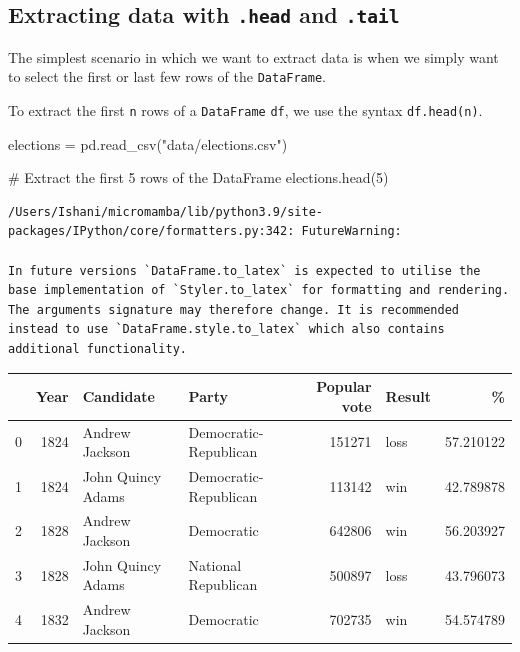 \documentclass[
  letterpaper,
  DIV=11,
  numbers=noendperiod]{scrreprt}
\newenvironment{Shaded}{\begin{snugshade}}{\end{snugshade}}
\newcommand{\CommentTok}[1]{\textcolor[rgb]{0.37,0.37,0.37}{#1}}
\newcommand{\DecValTok}[1]{\textcolor[rgb]{0.68,0.00,0.00}{#1}}
\newcommand{\NormalTok}[1]{\textcolor[rgb]{0.00,0.23,0.31}{#1}}
\newcommand{\OperatorTok}[1]{\textcolor[rgb]{0.37,0.37,0.37}{#1}}
\newcommand{\StringTok}[1]{\textcolor[rgb]{0.13,0.47,0.30}{#1}}
\begin{document}
\hypertarget{extracting-data-with-.head-and-.tail}{%
\subsection{\texorpdfstring{Extracting data with \texttt{.head} and
\texttt{.tail}}{Extracting data with .head and .tail}}\label{extracting-data-with-.head-and-.tail}}

The simplest scenario in which we want to extract data is when we simply
want to select the first or last few rows of the \texttt{DataFrame}.

To extract the first \texttt{n} rows of a \texttt{DataFrame}
\texttt{df}, we use the syntax \texttt{df.head(n)}.

\begin{Shaded}
\begin{Highlighting}[]
\NormalTok{elections }\OperatorTok{=}\NormalTok{ pd.read\_csv(}\StringTok{"data/elections.csv"}\NormalTok{)}
\end{Highlighting}
\end{Shaded}

\begin{Shaded}
\begin{Highlighting}[]
\CommentTok{\# Extract the first 5 rows of the DataFrame}
\NormalTok{elections.head(}\DecValTok{5}\NormalTok{)}
\end{Highlighting}
\end{Shaded}

\begin{verbatim}
/Users/Ishani/micromamba/lib/python3.9/site-packages/IPython/core/formatters.py:342: FutureWarning:

In future versions `DataFrame.to_latex` is expected to utilise the base implementation of `Styler.to_latex` for formatting and rendering. The arguments signature may therefore change. It is recommended instead to use `DataFrame.style.to_latex` which also contains additional functionality.
\end{verbatim}

\begin{tabular}{lrllrlr}
\toprule
{} &  Year &          Candidate &                  Party &  Popular vote & Result &          \% \\
\midrule
0 &  1824 &     Andrew Jackson &  Democratic-Republican &        151271 &   loss &  57.210122 \\
1 &  1824 &  John Quincy Adams &  Democratic-Republican &        113142 &    win &  42.789878 \\
2 &  1828 &     Andrew Jackson &             Democratic &        642806 &    win &  56.203927 \\
3 &  1828 &  John Quincy Adams &    National Republican &        500897 &   loss &  43.796073 \\
4 &  1832 &     Andrew Jackson &             Democratic &        702735 &    win &  54.574789 \\
\bottomrule
\end{tabular}
\end{document}
